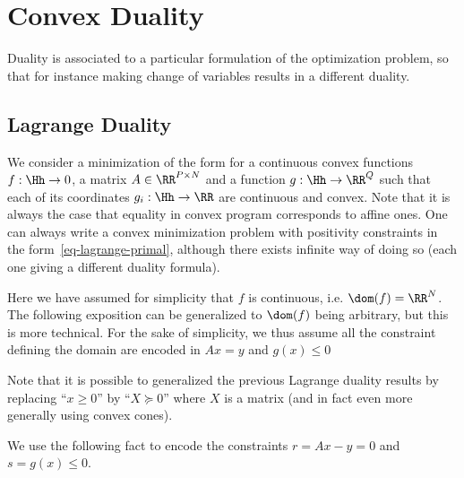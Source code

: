 \section{Convex Duality}
\label{sec-cvx-duality}

Duality is associated to a particular formulation of the optimization problem, so that for instance making change of variables results in a different duality. 

\subsection{Lagrange Duality}

We consider a minimization of the form
for a continuous convex functions $f : \Hh \rightarrow 0$, a matrix $A \in \RR^{P \times N}$ and a function $g : \Hh \rightarrow \RR^Q$ such that each of its coordinates $g_i : \Hh \rightarrow \RR$ are continuous and convex.  
%
Note that it is always the case that equality in convex program corresponds to affine ones. 
%
One can always write a convex minimization problem with positivity constraints in the form~\eqref{eq-lagrange-primal}, although there exists infinite way of doing so (each one giving a different duality formula). 

Here we have assumed for simplicity that $f$ is continuous, i.e. $\dom(f)=\RR^N$.
%
The following exposition can be generalized to $\dom(f)$ being arbitrary, but this is more technical. For the sake of simplicity, we thus assume all the constraint defining the domain are encoded in $Ax=y$ and $g(x) \leq 0$


Note that it is possible to generalized the previous Lagrange duality results by replacing ``$x \geq 0$'' by ``$X \succeq 0$'' where $X$ is a matrix (and in fact even more generally using convex cones). 

We use the following fact
to encode the constraints $r=Ax-y=0$ and $s=g(x) \leq 0$.

